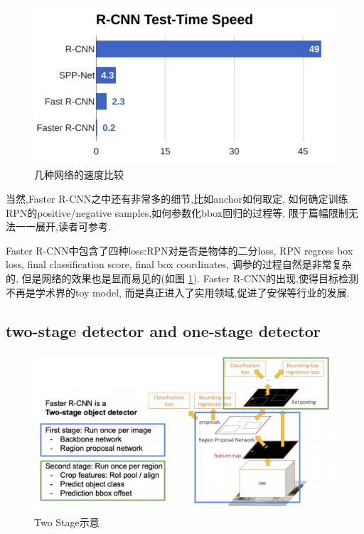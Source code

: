 \begin{figure}
    \includegraphics[scale=0.4]{figures/rcnn_speed_comparison.png}
    \caption{几种网络的速度比较}
    \label{fig:rcnn_speed}
\end{figure}

当然,Faster R-CNN之中还有非常多的细节,比如anchor如何取定,
如何确定训练RPN的positive/negative samples,如何参数化bbox回归的过程等,
限于篇幅限制无法一一展开,读者可参考\cite{FasterRCNN}.

Faster R-CNN中包含了四种loss:RPN对是否是物体的二分loss,
RPN regress box loss, final classification score, 
final box coordinates, 调参的过程自然是非常复杂的,
但是网络的效果也是显而易见的(如图 \ref{fig:rcnn_speed}).
Faster R-CNN的出现,使得目标检测不再是学术界的toy model, 
而是真正进入了实用领域,促进了安保等行业的发展.

\subsection{two-stage detector and one-stage detector}

\begin{figure}[htbp]
    \centering
    \includegraphics[scale=0.45]{figures/two_stage_detector.png}
    \caption{Two Stage示意}
\end{figure}


